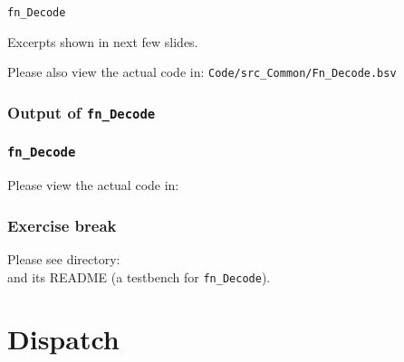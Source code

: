 \begin{frame}

\begin{center}
  {\LARGE\tt fn\_Decode}

  \vspace{5ex}

  Excerpts shown in next few slides.

  Please also view the actual code in:
  {\tt Code/src\_Common/Fn\_Decode.bsv}

\end{center}

\end{frame}


\begin{frame}[fragile]
\frametitle{Output of {\tt fn\_Decode}}

\footnotesize


\end{frame}


\begin{frame}
\frametitle{{\tt fn\_Decode}}

\footnotesize

\begin{center}\large
 Please view the actual code in: 
\end{center}

\end{frame}


\begin{frame}
\frametitle{\EmojiExercise \hmm Exercise break}

Please see directory:  \\
and its README (a testbench for {\tt fn\_Decode}).

\end{frame}


\section{Dispatch}

